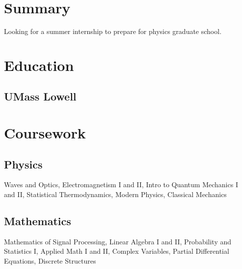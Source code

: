 \documentclass[letterpaper]{deedy-resume} %
\begin{document}
\begin{minipage}[t]{0.33\textwidth} %


\section{Summary}
Looking for a summer internship to prepare for physics graduate school.

\sectionspace


\section{Education} 

\subsection{UMass Lowell}



\sectionspace %


\section{Coursework}

\subsection{Physics}
 Waves and Optics, Electromagnetism I and II, Intro to Quantum Mechanics I and II, Statistical Thermodynamics, Modern Physics, Classical Mechanics

\subsection{Mathematics}
Mathematics of Signal Processing, Linear Algebra I and II, Probability and Statistics I, Applied Math I and II, Complex Variables, Partial Differential Equations, Discrete Structures\\

\sectionspace %


\end{minipage}
\end{document}
